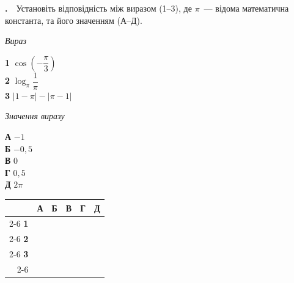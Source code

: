\documentclass[12pt]{article}
\newcommand{\matchingGrid}{%
    \begingroup
    \renewcommand{\arraystretch}{1.15}
    \setlength{\tabcolsep}{4pt}
    \footnotesize
    \begin{tabular}{r|c|c|c|c|c|}
         \multicolumn{1}{c}{} & \multicolumn{1}{c}{\textbf{А}} & \multicolumn{1}{c}{\textbf{Б}} & \multicolumn{1}{c}{\textbf{В}} & \multicolumn{1}{c}{\textbf{Г}} & \multicolumn{1}{c}{\textbf{Д}} \\ \cline{2-6}
         \textbf{1} & \phantom{X} & \phantom{X} & \phantom{X} & \phantom{X} & \phantom{X} \\ \cline{2-6}
         \textbf{2} & & & & & \\ \cline{2-6}
         \textbf{3} & & & & & \\ \cline{2-6}
    \end{tabular}
    \endgroup
}
\newcounter{zad}
\newcommand{\zadtask}[1]{\stepcounter{zad}\par\vspace{0.3cm}\noindent\textbf{\thezad.}\ \ #1\par\vspace{0.2cm}}
\begin{document}
\zadtask{Установіть відповідність між виразом (1--3), де $\pi$~--- відома математична константа, та його значенням (А--Д).
\vspace{0.3cm}
\noindent
\begin{minipage}[t]{0.45\textwidth}
\textit{Вираз}\par\vspace{0.15cm}
\textbf{1} \quad $\cos\left(-\dfrac{\pi}{3}\right)$\\[0.3cm]
\textbf{2} \quad $\log_\pi \dfrac{1}{\pi}$\\[0.3cm]
\textbf{3} \quad $|1 - \pi| - |\pi - 1|$
\end{minipage}
\hfill
\begin{minipage}[t]{0.3\textwidth}
\textit{Значення виразу}\par\vspace{0.15cm}
\textbf{А} \quad $-1$\\[0.15cm]
\textbf{Б} \quad $-0{,}5$\\[0.15cm]
\textbf{В} \quad $0$\\[0.15cm]
\textbf{Г} \quad $0{,}5$\\[0.15cm]
\textbf{Д} \quad $2\pi$
\end{minipage}
\hfill
\begin{minipage}[t]{0.2\textwidth}
\vspace{0.4cm}
\begin{flushright}\matchingGrid\end{flushright}
\end{minipage}}
\end{document}
